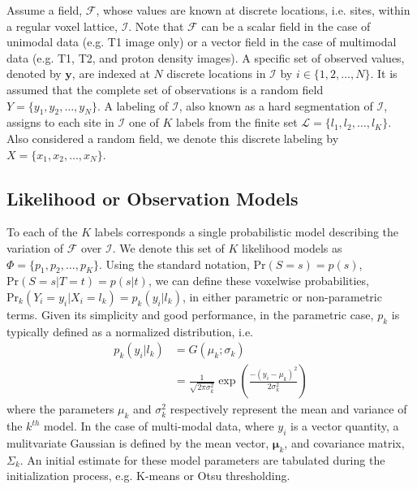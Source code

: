 \documentclass[11pt,english]{article}
\begin{document}
Assume a field, $\mathcal{F}$, whose values are known at discrete locations, i.e. sites, within a regular voxel lattice, $\mathcal{I}$.  Note that $\mathcal{F}$ can be a scalar field in the case of unimodal data (e.g. T1 image only) or a vector field in the case of multimodal data (e.g. T1, T2, and proton density images).
A specific set of observed values, denoted by $\mathbf{y}$, are indexed at $N$ discrete locations in $\mathcal{I}$ by $i \in \{1, 2, \ldots, N\}$.  It is assumed that the complete set of observations is a random field $Y = \{y_1, y_2, \ldots, y_N \}$.    A labeling of $\mathcal{I}$, 
also known as a hard segmentation of $\mathcal{I}$,
assigns to each site in $\mathcal{I}$ one of $K$ labels from the finite set $\mathcal{L} = \{l_1, l_2, \ldots, l_K\}$.  Also considered a random field, we denote this discrete labeling by $X = \{x_1, x_2, \ldots, x_N\}$.


\subsection{Likelihood or Observation Models}

To each of the $K$ labels corresponds a single probabilistic model describing the variation of $\mathcal{F}$ over $\mathcal{I}$.  We denote this set of $K$ likelihood models as $\Phi = \{p_1, p_2, \ldots, p_K\}$.  Using the standard notation, $\mathrm{Pr}(S=s) = p(s)$, $\mathrm{Pr}(S=s|T=t) = p(s|t)$, we can define these voxelwise probabilities, $\mathrm{Pr}_k( Y_i = y_i | X_i = l_k ) = p_k(y_i|l_k)$, in either parametric or non-parametric terms.   Given its simplicity and good performance, in the parametric case, $p_k$ is typically defined as a normalized distribution, i.e.
\begin{align}\label{eq:param}
  p_k\left(y_i|l_k\right) &= G\left(\mu_k;\sigma_k\right) \nonumber \\
                    &= \frac{1}{\sqrt{2\pi \sigma_k^2}}\exp\left( \frac{ -(y_i - \mu_k)^2 }{2\sigma_k^2} \right)
\end{align}
where the parameters $\mu_k$ and $\sigma_k^2$ respectively represent
the mean and variance of the $k^{th}$ model.  In the case of
multi-modal data, where $y_i$ is a vector quantity, a mulitvariate
Gaussian is defined by the mean vector, $\boldsymbol{\mu}_k$, and
covariance matrix, $\Sigma_k$.  An initial estimate for these model
parameters are tabulated during the initialization process,
e.g. K-means or Otsu thresholding.
\end{document}

